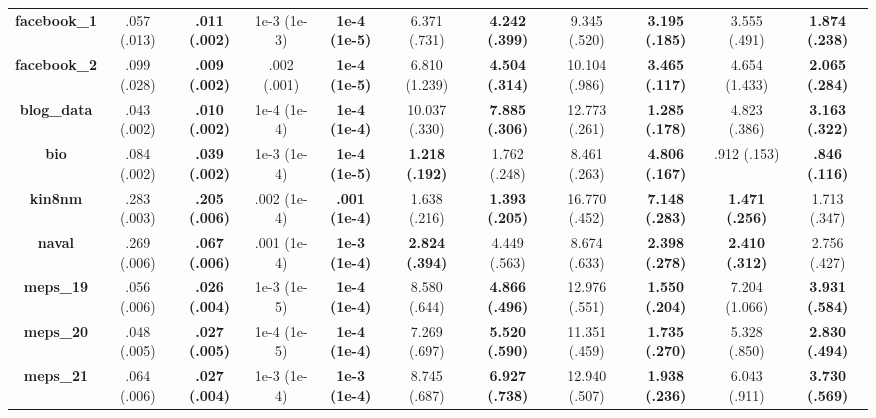 \documentclass{article}
\begin{document}
\begin{appendices}
\begin{table}[htbp]
{\begin{tabular}{ccccccccccc}
    \midrule
\textbf{facebook\_1} &    .057 (.013) &  \textbf{.011 (.002)} &  1e-3 (1e-3) &  \textbf{1e-4 (1e-5)} &           6.371 (.731) &  \textbf{4.242 (.399)} &       9.345 (.520) &  \textbf{3.195 (.185)} &           3.555 (.491) &  \textbf{1.874 (.238)} \\
\textbf{facebook\_2} &    .099 (.028) &  \textbf{.009 (.002)} &  .002 (.001) &  \textbf{1e-4 (1e-5)} &          6.810 (1.239) &  \textbf{4.504 (.314)} &      10.104 (.986) &  \textbf{3.465 (.117)} &          4.654 (1.433) &  \textbf{2.065 (.284)} \\
\textbf{blog\_data}  &    .043 (.002) &  \textbf{.010 (.002)} &  1e-4 (1e-4) &  \textbf{1e-4 (1e-4)} &          10.037 (.330) &  \textbf{7.885 (.306)} &      12.773 (.261) &  \textbf{1.285 (.178)} &           4.823 (.386) &  \textbf{3.163 (.322)} \\
\textbf{bio}        &    .084 (.002) &  \textbf{.039 (.002)} &  1e-3 (1e-4) &  \textbf{1e-4 (1e-5)} &  \textbf{1.218 (.192)} &           1.762 (.248) &       8.461 (.263) &  \textbf{4.806 (.167)} &            .912 (.153) &   \textbf{.846 (.116)} \\
\textbf{kin8nm}     &    .283 (.003) &  \textbf{.205 (.006)} &  .002 (1e-4) &  \textbf{.001 (1e-4)} &           1.638 (.216) &  \textbf{1.393 (.205)} &      16.770 (.452) &  \textbf{7.148 (.283)} &  \textbf{1.471 (.256)} &           1.713 (.347) \\
\textbf{naval}      &    .269 (.006) &  \textbf{.067 (.006)} &  .001 (1e-4) &  \textbf{1e-3 (1e-4)} &  \textbf{2.824 (.394)} &           4.449 (.563) &       8.674 (.633) &  \textbf{2.398 (.278)} &  \textbf{2.410 (.312)} &           2.756 (.427) \\
\textbf{meps\_19}    &    .056 (.006) &  \textbf{.026 (.004)} &  1e-3 (1e-5) &  \textbf{1e-4 (1e-4)} &           8.580 (.644) &  \textbf{4.866 (.496)} &      12.976 (.551) &  \textbf{1.550 (.204)} &          7.204 (1.066) &  \textbf{3.931 (.584)} \\
\textbf{meps\_20}    &    .048 (.005) &  \textbf{.027 (.005)} &  1e-4 (1e-5) &  \textbf{1e-4 (1e-4)} &           7.269 (.697) &  \textbf{5.520 (.590)} &      11.351 (.459) &  \textbf{1.735 (.270)} &           5.328 (.850) &  \textbf{2.830 (.494)} \\
\textbf{meps\_21}    &    .064 (.006) &  \textbf{.027 (.004)} &  1e-3 (1e-4) &  \textbf{1e-3 (1e-4)} &           8.745 (.687) &  \textbf{6.927 (.738)} &      12.940 (.507) &  \textbf{1.938 (.236)} &           6.043 (.911) &  \textbf{3.730 (.569)} \\
    

\end{tabular}}
\end{table}
\end{appendices}
\end{document}
